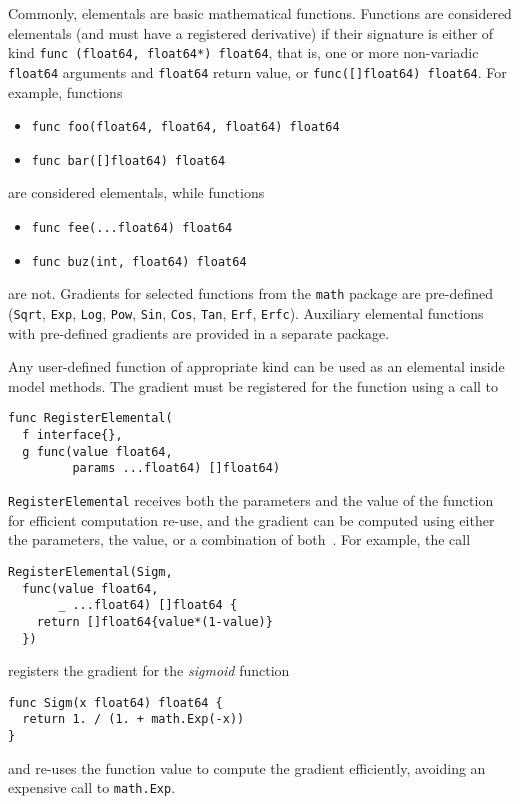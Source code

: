 \documentclass[sigplan,screen]{acmart}
\begin{document}
\begin{sloppypar}
Commonly, elementals are basic mathematical functions.
Functions are considered elementals (and must have a
registered derivative) if their signature is either of kind
\lstinline{func (float64, float64*) float64}, that is,
one or more non-variadic \lstinline{float64} arguments and
\lstinline{float64} return value, or \lstinline{func([]float64) float64}.
For example, functions
\begin{itemize}
  \item \lstinline{func foo(float64, float64, float64) float64}
  \item \lstinline{func bar([]float64) float64}
\end{itemize}
are considered elementals, while functions
\begin{itemize}
  \item \lstinline{func fee(...float64) float64}
  \item \lstinline{func buz(int, float64) float64}
\end{itemize}
are not. Gradients for selected functions from the
\lstinline{math} package are pre-defined (\lstinline{Sqrt},
\lstinline{Exp}, \lstinline{Log}, \lstinline{Pow},
\lstinline{Sin}, \lstinline{Cos}, \lstinline{Tan},
\lstinline{Erf}, \lstinline{Erfc}). Auxiliary elemental
functions with pre-defined gradients are provided in a separate
package.

Any user-defined function of appropriate kind can be used as an
elemental inside model methods. The gradient must be registered
for the function using a call to
\begin{lstlisting}
func RegisterElemental(
  f interface{},
  g func(value float64,
         params ...float64) []float64)
\end{lstlisting}
\lstinline{RegisterElemental} receives both the parameters and
the value of the function for efficient computation re-use, and
the gradient can be computed using either the parameters, the
value, or a combination of both~\cite{GW08}. For example, the
call
\begin{lstlisting}
RegisterElemental(Sigm,
  func(value float64,
       _ ...float64) []float64 {
    return []float64{value*(1-value)}
  })
\end{lstlisting}
registers the gradient for the \textit{sigmoid} function
\begin{lstlisting}
func Sigm(x float64) float64 {
  return 1. / (1. + math.Exp(-x))
}
\end{lstlisting}
and re-uses the function value to compute the gradient
efficiently, avoiding an expensive call to \lstinline{math.Exp}.


\end{sloppypar}
\end{document}
